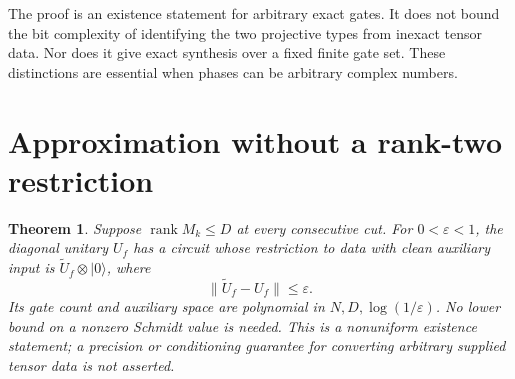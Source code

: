 \documentclass[11pt]{article}
\newtheorem{theorem}[lemma]{Theorem}
\begin{document}
The proof is an existence statement for arbitrary exact gates. It does
not bound the bit complexity of identifying the two projective types
from inexact tensor data. Nor does it give exact synthesis over a fixed
finite gate set. These distinctions are essential when phases can be
arbitrary complex numbers.

\section{Approximation without a rank-two restriction}

\begin{theorem}\label{thm:approx}
Suppose $\operatorname{rank}M_k\leq D$ at every consecutive cut.
For $0<\varepsilon<1$, the diagonal unitary $U_f$ has a circuit whose
restriction to data with clean auxiliary input is
$\widetilde U_f\otimes|0\rangle$, where
\[
 \|\widetilde U_f-U_f\|\leq\varepsilon.
\]
Its gate count and auxiliary space are polynomial in
$N,D,\log(1/\varepsilon)$. No lower bound on a nonzero Schmidt value is
needed. This is a nonuniform existence statement; a precision or
conditioning guarantee for converting arbitrary supplied tensor data
is not asserted.
\end{theorem}
\end{document}
